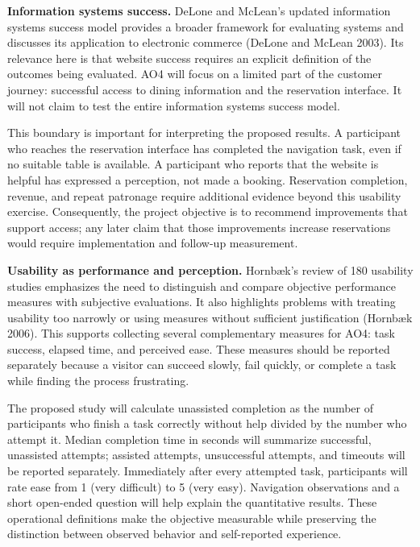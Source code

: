 \documentclass[
  12pt,
  letterpaper,
  DIV=11,
  numbers=noendperiod]{scrartcl}
\begin{document}
\textbf{Information systems success.} DeLone and McLean's updated
information systems success model provides a broader framework for
evaluating systems and discusses its application to electronic commerce
(DeLone and McLean 2003). Its relevance here is that website success
requires an explicit definition of the outcomes being evaluated. AO4
will focus on a limited part of the customer journey: successful access
to dining information and the reservation interface. It will not claim
to test the entire information systems success model.

This boundary is important for interpreting the proposed results. A
participant who reaches the reservation interface has completed the
navigation task, even if no suitable table is available. A participant
who reports that the website is helpful has expressed a perception, not
made a booking. Reservation completion, revenue, and repeat patronage
require additional evidence beyond this usability exercise.
Consequently, the project objective is to recommend improvements that
support access; any later claim that those improvements increase
reservations would require implementation and follow-up measurement.

\textbf{Usability as performance and perception.} Hornbæk's review of
180 usability studies emphasizes the need to distinguish and compare
objective performance measures with subjective evaluations. It also
highlights problems with treating usability too narrowly or using
measures without sufficient justification (Hornbæk 2006). This supports
collecting several complementary measures for AO4: task success, elapsed
time, and perceived ease. These measures should be reported separately
because a visitor can succeed slowly, fail quickly, or complete a task
while finding the process frustrating.

The proposed study will calculate unassisted completion as the number of
participants who finish a task correctly without help divided by the
number who attempt it. Median completion time in seconds will summarize
successful, unassisted attempts; assisted attempts, unsuccessful
attempts, and timeouts will be reported separately. Immediately after
every attempted task, participants will rate ease from 1 (very
difficult) to 5 (very easy). Navigation observations and a short
open-ended question will help explain the quantitative results. These
operational definitions make the objective measurable while preserving
the distinction between observed behavior and self-reported experience.
\end{document}
